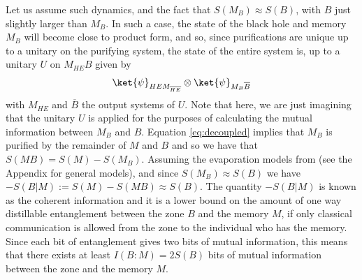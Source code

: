 \documentclass[11pt,a4paper]{article}
\begin{document}
Let us assume such dynamics, and the fact that $S(M_B)\approx S(B)$, with $B$ just slightly larger than $M_B$. In such a case,
the state of the black hole and memory $M_B$ will become close to product form\cite{FQSW,HaydenPreskill,dupuis2010one}, and so, since purifications are unique up to a unitary on the purifying system, the state of the entire system is, up to a unitary $U$ on $M_{HE}B$ given by
\begin{align}
\ket{\psi}_{HEM_{\overline{HE}}}\otimes\ket{\psi}_{M_B\overline{B}}
\label{eq:decoupled}
\end{align}
with $M_{\overline{HE}}$ and $\overline{B}$ the output systems of $U$. Note that here, we are just imagining that the unitary $U$ is applied for the purposes of calculating the mutual information between $M_B$ and $B$. Equation \eqref{eq:decoupled} implies that $M_B$ is purified by the remainder of $M$ and $B$ and so we have
 that $S(MB)=S(M)-S(M_B)$. 
Assuming the evaporation models from \cite{bhlock,HaydenPreskill,sekino2008fast} (see the Appendix for general models), and since $S(M_B)\approx S(B)$ we have
$-S(B|M):=S(M)-S(MB)\approx S(B)$.
The quantity $-S(B|M)$ is known as the coherent information\cite{schumacher1996quantum} and it is a lower bound on the amount of one way distillable entanglement between the zone $B$ and the memory $M$, if only classical communication is allowed from the zone to the individual who has the memory\cite{devetak2005distillation}. Since each bit of entanglement gives two bits of mutual information, this means that there exists at least $I(B:M)=2S(B)$ bits of mutual information between the zone and the memory $M$. 
\end{document}
